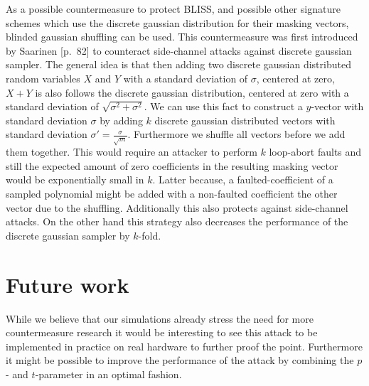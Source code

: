 \documentclass[a4paper,titlepage]{article}
\begin{document}
As a possible countermeasure to protect BLISS, and possible other signature schemes which use the discrete gaussian distribution for their masking vectors, blinded gaussian shuffling can be used. This countermeasure was first introduced by Saarinen \cite{multishuffle}[p.~82] to counteract side-channel attacks against discrete gaussian sampler. The general idea is that then adding two discrete gaussian distributed random variables $X$ and $Y$ with a standard deviation of $\sigma$, centered at zero, $X + Y$ is also follows the discrete gaussian distribution, centered at zero with a standard deviation of $\sqrt{σ^{2} + σ^{2}}$. We can use this fact to construct a $y$-vector with standard deviation $σ$ by adding $k$ discrete gaussian distributed vectors with standard deviation $σ' = \frac{σ}{\sqrt{m}}$. Furthermore we shuffle all vectors before we add them together. This would require an attacker to perform $k$ loop-abort faults and still the expected amount of zero coefficients in the resulting masking vector would be exponentially small in $k$. Latter because, a faulted-coefficient of a sampled polynomial might be added with a non-faulted coefficient the other vector due to the shuffling. Additionally this also protects against side-channel attacks. On the other hand this strategy also decreases the performance of the discrete gaussian sampler by $k$-fold. 


\section{Future work}
While we believe that our simulations already stress the need for more countermeasure research it would be interesting to see this attack to be implemented in practice on real hardware to further proof the point. Furthermore it might be possible to improve the performance of the attack by combining the $p$- and $t$-parameter in an optimal fashion.

\printbibliography
\end{document}
